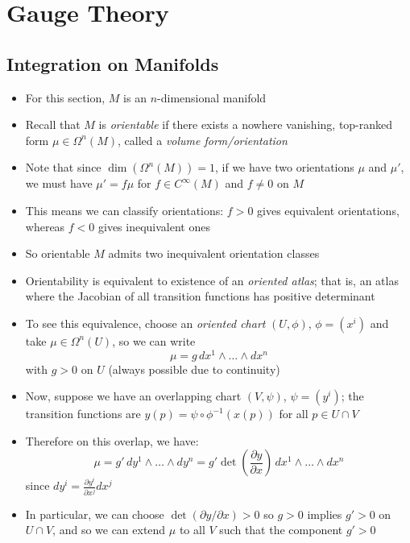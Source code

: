 \documentclass[12pt,a4paper]{article}
\numberwithin{equation}{section}
\begin{document}
	\section{Gauge Theory}
	\subsection{Integration on Manifolds}
	\begin{itemize}
		\item For this section, $M$ is an $n$-dimensional manifold
		\item Recall that $M$ is \textit{orientable} if there exists a nowhere vanishing, top-ranked form $\mu\in \Omega^{n}(M)$, called a \textit{volume form/orientation}
		\item Note that since $\dim(\Omega^{n}(M))=1$, if we have two orientations $\mu$ and $\mu'$, we must have $\mu'=f\mu$ for $f\in C^{\infty}(M)$ and $f\neq 0$ on $M$
		\item This means we can classify orientations: $f>0$ gives equivalent orientations, whereas $f<0$ gives inequivalent ones
		\item So orientable $M$ admits two inequivalent orientation classes
		\item Orientability is equivalent to existence of an \textit{oriented atlas}; that is, an atlas where the Jacobian of all transition functions has positive determinant
		\item To see this equivalence, choose an \textit{oriented chart} $(U,\phi)$, $\phi=(x^{i})$ and take $\mu\in \Omega^{n}(U)$, so we can write
		\begin{equation}
			\mu=g\,dx^{1}\wedge\ldots\wedge dx^{n}
		\end{equation}
		with $g>0$ on $U$ (always possible due to continuity)
		\item Now, suppose we have an overlapping chart $(V,\psi)$, $\psi=(y^{i})$; the transition functions are $y(p)=\psi\circ\phi^{-1}(x(p))$ for all $p\in U\cap V$
		\item Therefore on this overlap, we have:
		\begin{equation}
			\mu=g'\,dy^{1}\wedge\ldots\wedge dy^{n}=g'\det\left(\frac{\partial y}{\partial x}\right)\,dx^{1}\wedge\ldots\wedge dx^{n}
		\end{equation}
		since $dy^{i}=\frac{\partial y^{i}}{\partial x^{j}}dx^{j}$
		\item In particular, we can choose $\det(\partial y/\partial x)>0$ so $g>0$ implies $g'>0$ on $U\cap V$, and so we can extend $\mu$ to all $V$ such that the component $g'>0$

\end{itemize}
\end{document}
